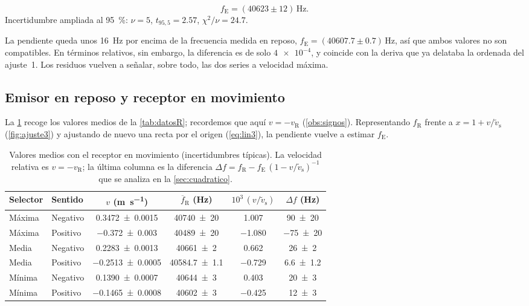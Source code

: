 \documentclass[a4paper,11pt]{amsart}
\numberwithin{equation}{section}
\newcommand{\vst}{\tilde{v}_{\mathrm{s}}}     %
\newcommand{\vR}{v_{\mathrm{R}}}              %
\newcommand{\fE}{f_{\mathrm{E}}}              %
\newcommand{\fR}{f_{\mathrm{R}}}              %
\newcommand{\mean}[1]{\overline{#1}}
\theoremstyle{cienplano}
\theoremstyle{ciendef}
\theoremstyle{cienobs}
\begin{document}
\begin{destacado}
\vspace{-4pt}
\begin{equation}\label{eq:fEajuste2}
  \fE=(\num{40623}\pm\num{12})\,\si{\hertz}.
\end{equation}
{\small Incertidumbre ampliada al \SI{95}{\percent}: $\nu=5$, $t_{95,5}=\num{2,57}$,
$\chi^{2}/\nu=\num{24,7}$.}
\end{destacado}
La pendiente queda unos \SI{16}{\hertz} por encima de la frecuencia medida en
reposo, $\fE=(\num{40607,7}\pm\num{0,7})\,\si{\hertz}$, así que ambos valores no son
compatibles. En términos relativos, sin embargo, la diferencia es de solo
$\num{4e-4}$, y coincide con la deriva que ya delataba la ordenada del ajuste~1.
Los residuos vuelven a señalar, sobre todo, las dos series a velocidad máxima.

\subsection{Emisor en reposo y receptor en movimiento}
La \cref{tab:mediasR} recoge los valores medios de la \cref{tab:datosR};
recordemos que aquí $v=-\vR$ (\cref{obs:signos}). Representando $\fR$ frente a
$x=1+v/\vst$ (\cref{fig:ajuste3}) y ajustando de nuevo una recta por el origen
(\cref{eq:lin3}), la pendiente vuelve a estimar $\fE$.

\begin{table}[ht]
\centering
\caption{Valores medios con el receptor en movimiento (incertidumbres típicas). La
velocidad relativa es $v=-\vR$; la última columna es la diferencia
$\Delta f=\fR-\fE\,(1-v/\vst)^{-1}$ que se analiza en la \cref{sec:cuadratico}.}
\label{tab:mediasR}
\small
\renewcommand{\arraystretch}{1.25}
\begin{tabular}{@{}llcccc@{}}
\toprule
Selector & Sentido & $v$ (\si{\meter\per\second}) & $\mean{f}_{\mathrm{R}}$ (\si{\hertz}) & $10^{3}\,(v/\vst)$ & $\Delta f$ (\si{\hertz})\\
\midrule
Máxima & Negativo & \num{0,3472 +- 0,0015} & \num{40740 +- 20} & \num{1.007} & \num{90 +- 20}\\
Máxima & Positivo & \num{-0,372 +- 0,003} & \num{40489 +- 20} & \num{-1.080} & \num{-75 +- 20}\\
Media & Negativo & \num{0,2283 +- 0,0013} & \num{40661 +- 2} & \num{0.662} & \num{26 +- 2}\\
Media & Positivo & \num{-0,2513 +- 0,0005} & \num{40584,7 +- 1,1} & \num{-0.729} & \num{6,6 +- 1,2}\\
Mínima & Negativo & \num{0,1390 +- 0,0007} & \num{40644 +- 3} & \num{0.403} & \num{20 +- 3}\\
Mínima & Positivo & \num{-0,1465 +- 0,0008} & \num{40602 +- 3} & \num{-0.425} & \num{12 +- 3}\\
\bottomrule
\end{tabular}
\end{table}
\end{document}
